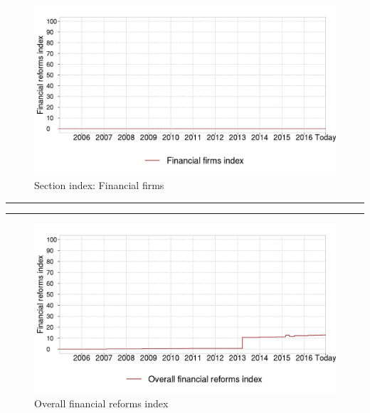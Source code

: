 \documentclass[a4paper,12pt,leqno]{article}
\makeatletter
\renewenvironment{titlepage}
{%
  \cleardoublepage
  \if@twocolumn
  \@restonecoltrue\onecolumn
  \else
  \@restonecolfalse\newpage
  \fi
  \thispagestyle{empty}%
}%
{\if@restonecol\twocolumn \else \newpage \fi
}
\renewenvironment{titlepage}
{%
  \cleardoublepage
  \if@twocolumn
  \@restonecoltrue\onecolumn
  \else
  \@restonecolfalse\newpage
  \fi
  \thispagestyle{empty}%
}%
{\if@restonecol\twocolumn \else \newpage \fi
  \if@twoside\else
  \fi
}
\newlength{\textwidthorig}
\makeatother
\begin{document}
\begin{figure}[H]
\caption{Section index: Financial firms}
\centering
\includegraphics[width=0.9\paperwidth,height=0.7\paperwidth]{../GRAPHS/frm_index_financial_firms.png}
\end{figure}
  

\begin{titlepage}

  \parbox{\textwidthorig}{
  \hrule
  \vspace{\baselineskip} 
  \vspace{\baselineskip}
  \hrule
  }

  \parbox{\textwidthorig}{
}
\end{titlepage}

\newpage
{}

\begin{figure}[H]
\caption{Overall financial reforms index}
\centering
\includegraphics[width=0.9\paperwidth,height=0.7\paperwidth]{../GRAPHS/frm_index_financial_reforms_index.png}
\end{figure}

  
\end{document}
